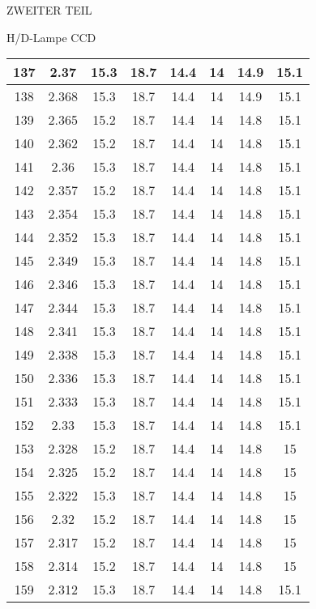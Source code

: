 \begin{appendix}
\begin{chapter}{ZWEITER TEIL}
\begin{section}{H/D-Lampe CCD}
\begin{scriptsize}
\begin{longtable}[htbp]{|c|c|c|c|c|c|c|c|}
            137 & 2.37 & 15.3 & 18.7 & 14.4 & 14 & 14.9 & 15.1 \\ \hline
            138 & 2.368 & 15.3 & 18.7 & 14.4 & 14 & 14.9 & 15.1 \\ \hline
            139 & 2.365 & 15.2 & 18.7 & 14.4 & 14 & 14.8 & 15.1 \\ \hline
            140 & 2.362 & 15.2 & 18.7 & 14.4 & 14 & 14.8 & 15.1 \\ \hline
            141 & 2.36 & 15.3 & 18.7 & 14.4 & 14 & 14.8 & 15.1 \\ \hline
            142 & 2.357 & 15.2 & 18.7 & 14.4 & 14 & 14.8 & 15.1 \\ \hline
            143 & 2.354 & 15.3 & 18.7 & 14.4 & 14 & 14.8 & 15.1 \\ \hline
            144 & 2.352 & 15.3 & 18.7 & 14.4 & 14 & 14.8 & 15.1 \\ \hline
            145 & 2.349 & 15.3 & 18.7 & 14.4 & 14 & 14.8 & 15.1 \\ \hline
            146 & 2.346 & 15.3 & 18.7 & 14.4 & 14 & 14.8 & 15.1 \\ \hline
            147 & 2.344 & 15.3 & 18.7 & 14.4 & 14 & 14.8 & 15.1 \\ \hline
            148 & 2.341 & 15.3 & 18.7 & 14.4 & 14 & 14.8 & 15.1 \\ \hline
            149 & 2.338 & 15.3 & 18.7 & 14.4 & 14 & 14.8 & 15.1 \\ \hline
            150 & 2.336 & 15.3 & 18.7 & 14.4 & 14 & 14.8 & 15.1 \\ \hline
            151 & 2.333 & 15.3 & 18.7 & 14.4 & 14 & 14.8 & 15.1 \\ \hline
            152 & 2.33 & 15.3 & 18.7 & 14.4 & 14 & 14.8 & 15.1 \\ \hline
            153 & 2.328 & 15.2 & 18.7 & 14.4 & 14 & 14.8 & 15 \\ \hline
            154 & 2.325 & 15.2 & 18.7 & 14.4 & 14 & 14.8 & 15 \\ \hline
            155 & 2.322 & 15.3 & 18.7 & 14.4 & 14 & 14.8 & 15 \\ \hline
            156 & 2.32 & 15.2 & 18.7 & 14.4 & 14 & 14.8 & 15 \\ \hline
            157 & 2.317 & 15.2 & 18.7 & 14.4 & 14 & 14.8 & 15 \\ \hline
            158 & 2.314 & 15.2 & 18.7 & 14.4 & 14 & 14.8 & 15 \\ \hline
            159 & 2.312 & 15.3 & 18.7 & 14.4 & 14 & 14.8 & 15.1 \\ \hline

\end{longtable}
\end{scriptsize}
\end{section}
\end{chapter}
\end{appendix}
